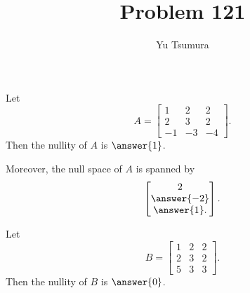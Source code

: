 \documentclass{ximera}
\title{Problem 121}
\author{Yu Tsumura}
\begin{document}
\begin{problem}
  
	 Let
\[A=\begin{bmatrix}
  1 & 2 & 2 \\
   2 &3 &2 \\
   -1 & -3 & -4
 \end{bmatrix}.
\]
Then the nullity of $A$ is $\answer{1}$.
\begin{problem}
Moreover, the null space of $A$ is spanned by
\[
  \begin{bmatrix}
    2 \\
    \answer{-2} \\
    \answer{1}.
  \end{bmatrix}.
\]
\end{problem}
\end{problem}

\begin{problem}
Let
\[
  B=\begin{bmatrix}
    1 & 2 & 2 \\
    2 &3 &2 \\
    5 & 3 & 3
  \end{bmatrix}.
\]
Then the nullity of $B$ is $\answer{0}$.
\end{problem}

	
\end{document}
